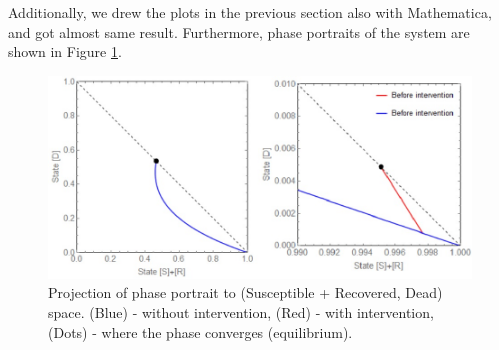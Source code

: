 Additionally, we drew the plots in the previous section also with Mathematica, and got almost same result. Furthermore, phase portraits of the system are shown in Figure \ref{fig:PhasePortrait}. 

\begin{figure}[!h]
  \centering
  \includegraphics[width=1\textwidth]{PhasePortrait}
  \caption{Projection of phase portrait to (Susceptible + Recovered, Dead) space. (Blue) - without intervention, (Red) - with intervention, (Dots) - where the phase converges (equilibrium).}
\label{fig:PhasePortrait}
\end{figure}
